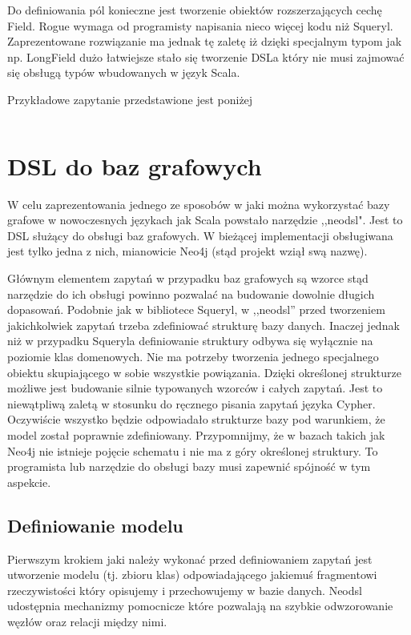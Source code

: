 \documentclass[brudnopis]{xmgr}
\begin{document}
Do definiowania pól konieczne jest tworzenie obiektów rozszerzających cechę Field. Rogue wymaga od programisty napisania nieco więcej kodu niż Squeryl. Zaprezentowane rozwiązanie ma jednak tę zaletę iż dzięki specjalnym typom jak np. LongField dużo łatwiejsze stało się tworzenie DSLa który nie musi zajmować się obsługą typów wbudowanych w język Scala.

Przykładowe zapytanie przedstawione jest poniżej

\inputminted{scala}{listings/scala/rogue-query.scala}

\chapter{DSL do baz grafowych}

W celu zaprezentowania jednego ze sposobów w jaki można wykorzystać bazy grafowe w nowoczesnych językach jak Scala powstało narzędzie ,,neodsl". Jest to DSL służący do obsługi baz grafowych. W bieżącej implementacji obsługiwana jest tylko jedna z nich, mianowicie Neo4j (stąd projekt wziął swą nazwę). 

Głównym elementem zapytań w przypadku baz grafowych są wzorce stąd narzędzie do ich obsługi powinno pozwalać na budowanie dowolnie długich dopasowań. Podobnie jak w bibliotece Squeryl, w ,,neodsl'' przed tworzeniem jakichkolwiek zapytań trzeba zdefiniować strukturę bazy danych. Inaczej jednak niż w przypadku Squeryla definiowanie struktury odbywa się wyłącznie na poziomie klas domenowych. Nie ma potrzeby tworzenia jednego specjalnego obiektu skupiającego w sobie wszystkie powiązania. Dzięki określonej strukturze możliwe jest budowanie silnie typowanych wzorców i całych zapytań. Jest to niewątpliwą zaletą w stosunku do ręcznego pisania zapytań języka Cypher. Oczywiście wszystko będzie odpowiadało strukturze bazy pod warunkiem, że model został poprawnie zdefiniowany. Przypomnijmy, że w bazach takich jak Neo4j nie istnieje pojęcie schematu i nie ma z góry określonej struktury. To programista lub narzędzie do obsługi bazy musi zapewnić spójność w tym aspekcie.

\section{Definiowanie modelu}

Pierwszym krokiem jaki należy wykonać przed definiowaniem zapytań jest utworzenie modelu (tj. zbioru klas) odpowiadającego jakiemuś fragmentowi rzeczywistości który opisujemy i przechowujemy w bazie danych. Neodsl udostępnia mechanizmy pomocnicze które pozwalają na szybkie odwzorowanie węzłów oraz relacji między nimi.
\end{document}
